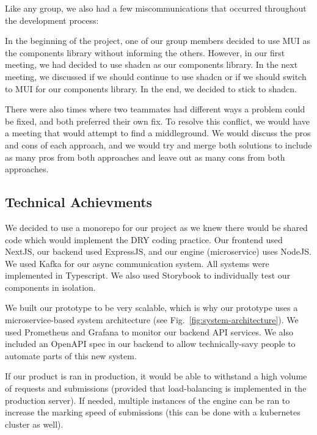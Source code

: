\documentclass[a4paper, 12pt]{article}
\newcommand{\Example}[1]{\begin{example}#1\end{example}}
\begin{document}
Like any group, we also had a few miscommunications that occurred throughout the development process:

\Example {In the beginning of the project, one of our group members decided to use MUI as the components library without informing the others. However, in our first meeting, we had decided to use shadcn as our components library. In the next meeting, we discussed if we should continue to use shadcn or if we should switch to MUI for our components library. In the end, we decided to stick to shadcn.}
         
There were also times where two teammates had different ways a problem could be fixed, and both preferred their own fix. To resolve this conflict, we would have a meeting that would attempt to find a middleground. We would discuss the pros and cons of each approach, and we would try and merge both solutions to include as many pros from both approaches and leave out as many cons from both approaches.

\subsection*{Technical Achievments}
We decided to use a monorepo for our project as we knew there would be shared code which would implement the DRY coding practice. Our frontend used NextJS, our backend used ExpressJS, and our engine (microservice) uses NodeJS. We used Kafka for our async communication system. All systems were implemented in Typescript. We also used Storybook to individually test our components in isolation.

We built our prototype to be very scalable, which is why our prototype uses a microservice-based system architecture (see Fig.~\ref{fig:system-architecture}). We used Prometheus and Grafana to monitor our backend API services. We also included an OpenAPI spec in our backend to allow technically-savy people to automate parts of this new system.


If our product is ran in production, it would be able to withstand a high volume of requests and submissions (provided that load-balancing is implemented in the production server). If needed, multiple instances of the engine can be ran to increase the marking speed of submissions (this can be done with a kubernetes cluster as well).
\end{document}
